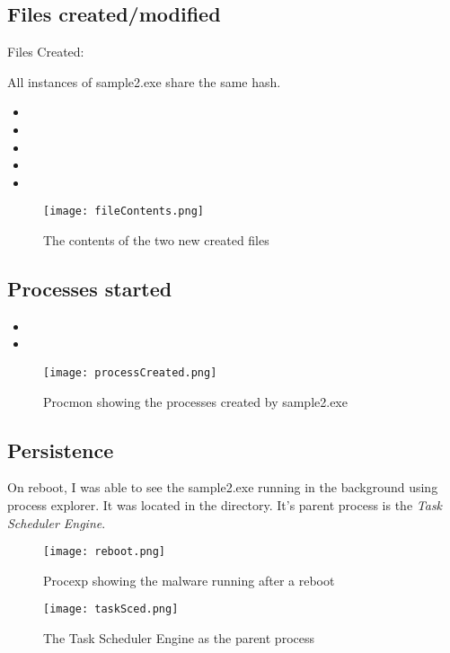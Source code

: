 \documentclass{article}
\begin{document}
    \subsection{Files created/modified}
    Files Created:


    All instances of sample2.exe share the same hash.
    \begin{itemize}
        \item {}
        \item {}
        \item {}
        \item {}
        \item {}
    \end{itemize}
    \begin{figure}[H]
        \texttt{[image: fileContents.png]}
        \caption{The contents of the two new created files}
    \end{figure}
    \subsection{Processes started}
    \begin{itemize}
        \item {}
        \item {}
    \end{itemize}
    \begin{figure}[H]
        \texttt{[image: processCreated.png]}
        \caption{Procmon showing the processes created by sample2.exe}
    \end{figure}

    \subsection{Persistence}
    On reboot, I was able to see the sample2.exe running in the background using process explorer. It was located in the  directory. It's parent process is the \textit{Task Scheduler Engine}.
    \begin{figure}[H]
        \texttt{[image: reboot.png]}
        \caption{Procexp showing the malware running after a reboot}
    \end{figure}
    \begin{figure}[H]
        \texttt{[image: taskSced.png]}
        \caption{The Task Scheduler Engine as the parent process}
    \end{figure}
\end{document}
